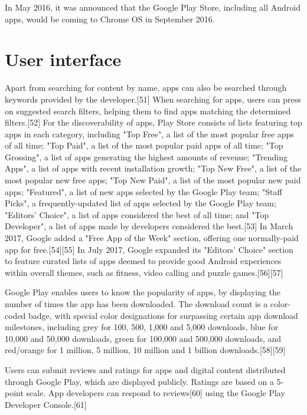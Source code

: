 \documentclass{article}                    %
\begin{document}
In May 2016, it was announced that the Google Play Store, including all Android apps, would be coming to Chrome OS in September 2016.
\section{ User interface}    
Apart from searching for content by name, apps can also be searched through keywords provided by the developer.[51] When searching for apps, users can press on suggested search filters, helping them to find apps matching the determined filters.[52] For the discoverability of apps, Play Store consists of lists featuring top apps in each category, including "Top Free", a list of the most popular free apps of all time; "Top Paid", a list of the most popular paid apps of all time; "Top Grossing", a list of apps generating the highest amounts of revenue; "Trending Apps", a list of apps with recent installation growth; "Top New Free", a list of the most popular new free apps; "Top New Paid", a list of the most popular new paid apps; "Featured", a list of new apps selected by the Google Play team; "Staff Picks", a frequently-updated list of apps selected by the Google Play team; "Editors' Choice", a list of apps considered the best of all time; and "Top Developer", a list of apps made by developers considered the best.[53] In March 2017, Google added a "Free App of the Week" section, offering one normally-paid app for free.[54][55] In July 2017, Google expanded its "Editors' Choice" section to feature curated lists of apps deemed to provide good Android experiences within overall themes, such as fitness, video calling and puzzle games.[56][57]

Google Play enables users to know the popularity of apps, by displaying the number of times the app has been downloaded. The download count is a color-coded badge, with special color designations for surpassing certain app download milestones, including grey for 100, 500, 1,000 and 5,000 downloads, blue for 10,000 and 50,000 downloads, green for 100,000 and 500,000 downloads, and red/orange for 1 million, 5 million, 10 million and 1 billion downloads.[58][59]

Users can submit reviews and ratings for apps and digital content distributed through Google Play, which are displayed publicly. Ratings are based on a 5-point scale. App developers can respond to reviews[60] using the Google Play Developer Console.[61]
\end{document}
